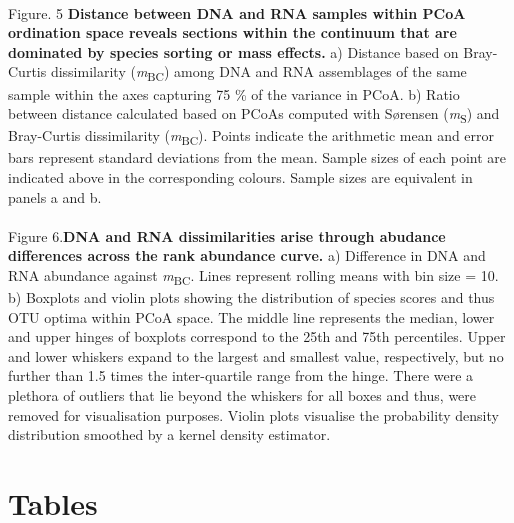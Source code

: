 \documentclass[12pt,a4paper]{article} %
\begin{document}
\\
Figure. 5 \textbf{Distance between DNA and RNA samples within PCoA ordination space reveals sections within the continuum that are dominated by species sorting or mass effects.} a) Distance based on Bray-Curtis dissimilarity (\textit{m}\textsubscript{BC}) among DNA and RNA assemblages of the same sample within the axes capturing 75 \% of the variance in PCoA. b) Ratio between distance calculated based on PCoAs computed with S{\o}rensen (\textit{m}\textsubscript{S}) and Bray-Curtis dissimilarity (\textit{m}\textsubscript{BC}). Points indicate the arithmetic mean and error bars represent standard deviations from the mean. Sample sizes of each point are indicated above in the corresponding colours. Sample sizes are equivalent in panels a and b. \\
\\
Figure 6.\textbf{DNA and RNA dissimilarities arise through abudance differences across the rank abundance curve.} a) Difference in DNA and RNA abundance against \textit{m}\textsubscript{BC}. Lines represent rolling means with bin size = 10. b) Boxplots and violin plots showing the distribution of species scores and thus OTU optima within PCoA space. The middle line represents the median, lower and upper hinges of boxplots correspond to the 25th and 75th percentiles. Upper and lower whiskers expand to the largest and smallest value, respectively, but no further than 1.5 times the inter-quartile range from the hinge. There were a plethora of outliers that lie beyond the whiskers for all boxes and thus, were removed for visualisation purposes. Violin plots visualise the probability density distribution smoothed by a kernel density estimator. \\

\section*{Tables}
\end{document}
